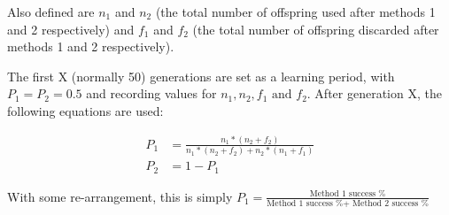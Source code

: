 Also defined are $n_1$ and $n_2$ (the total number of offspring used after methods 1 and 2 respectively) and $f_1$ and $f_2$ (the total number of offspring discarded after methods 1 and 2 respectively). 

The first X (normally 50) generations are set as a learning period, with $P_1 = P_2 = 0.5$ and recording values for $n_1, n_2,f_1\text{ and }f_2$. After generation X, the following equations are used:

\begin{align}
    P_1 &= \frac{n_1 * (n_2+f_2)}{n_1 * (n_2+f_2) + n_2 * (n_1+f_1)} \\
    P_2 &= 1-P_1 \nonumber
\end{align}

With some re-arrangement, this is simply \(P_1 = \frac{\text{Method 1 success \%}}{\text{Method 1 success \% + Method 2 success \%}}\)




